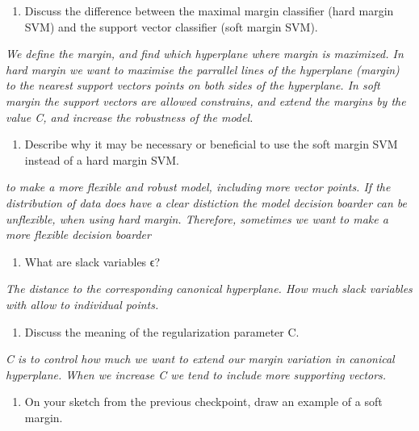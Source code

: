 \documentclass[
  letterpaper,
  DIV=11,
  numbers=noendperiod]{scrartcl}
\providecommand{\tightlist}{%
  \setlength{\itemsep}{0pt}\setlength{\parskip}{0pt}}\usepackage{longtable,booktabs,array}
\begin{document}
\begin{enumerate}
\def\labelenumi{(\alph{enumi})}
\tightlist
\item
  Discuss the difference between the maximal margin classifier (hard
  margin SVM) and the support vector classifier (soft margin SVM).
\end{enumerate}

\emph{We define the margin, and find which hyperplane where margin is
maximized. In hard margin we want to maximise the parrallel lines of the
hyperplane (margin) to the nearest support vectors points on both sides
of the hyperplane. In soft margin the support vectors are allowed
constrains, and extend the margins by the value C, and increase the
robustness of the model.}

\begin{enumerate}
\def\labelenumi{(\alph{enumi})}
\setcounter{enumi}{1}
\tightlist
\item
  Describe why it may be necessary or beneficial to use the soft margin
  SVM instead of a hard margin SVM.
\end{enumerate}

\emph{to make a more flexible and robust model, including more vector
points. If the distribution of data does have a clear distiction the
model decision boarder can be unflexible, when using hard margin.
Therefore, sometimes we want to make a more flexible decision boarder}

\begin{enumerate}
\def\labelenumi{(\alph{enumi})}
\setcounter{enumi}{2}
\tightlist
\item
  What are slack variables ϵ?
\end{enumerate}

\emph{The distance to the corresponding canonical hyperplane. How much
slack variables with allow to individual points.}

\begin{enumerate}
\def\labelenumi{(\alph{enumi})}
\setcounter{enumi}{3}
\tightlist
\item
  Discuss the meaning of the regularization parameter C.
\end{enumerate}

\emph{C is to control how much we want to extend our margin variation in
canonical hyperplane. When we increase C we tend to include more
supporting vectors.}

\begin{enumerate}
\def\labelenumi{(\alph{enumi})}
\setcounter{enumi}{4}
\tightlist
\item
  On your sketch from the previous checkpoint, draw an example of a soft
  margin.
\end{enumerate}
\end{document}
